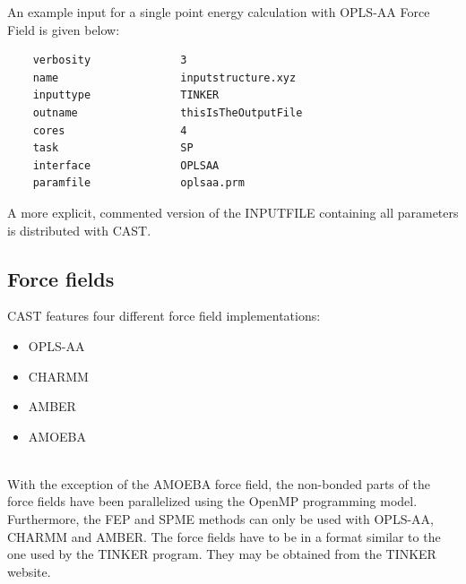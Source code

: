 \documentclass[10pt,a4paper]{article} %
\begin{document}
	An example input for a single point energy calculation with \ac{OPLS-AA} Force Field\supercite{oplsaa, oplsaa2} is given below:
	
	\begin{lstlisting}
	verbosity              3
	name                   inputstructure.xyz
	inputtype              TINKER
	outname                thisIsTheOutputFile
	cores                  4
	task                   SP
	interface              OPLSAA
	paramfile              oplsaa.prm\end{lstlisting}

	A more explicit, commented version of the INPUTFILE containing all parameters is distributed with \ac{CAST}.
		
	\subsection{Force fields}
	\ac{CAST} features four different force field implementations:\\
	\begin{itemize}
	 \item \acf{OPLS-AA}\supercite{oplsaa, oplsaa2} \item \acf{CHARMM}\supercite{charmm}
	 \item \acf{AMBER}\supercite{amber}
	 \item \acf{AMOEBA}\supercite{amoeba_current, amoeba_current2}
	\end{itemize}~\\
	With the exception of the \ac{AMOEBA} force field, the non-bonded parts of the force fields have been parallelized using the OpenMP programming model. Furthermore, the \ac{FEP} and SPME  methods can only be used with \ac{OPLS-AA}, \ac{CHARMM} and \ac{AMBER}. The force fields have to be in a format similar to the one used by the TINKER\supercite{tinker} program. They may be obtained from the TINKER\supercite{tinker} website.
\end{document}
